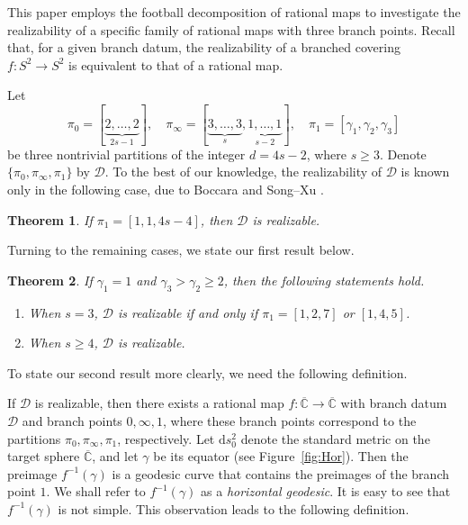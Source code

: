 \documentclass[microtype]{gtpart}     %
\newtheorem{thm}{Theorem}[section]    %
\theoremstyle{definition}
\begin{document}
This paper employs the football decomposition of rational maps to investigate the realizability of a specific family of rational maps with three branch points. Recall that, for a given branch datum, the realizability of a branched covering $f \colon S^{2} \to S^{2}$ is equivalent to that of a rational map.

Let
\[
\pi_{0}=[\underbrace{2,\ldots,2}_{2s-1}],\quad
\pi_{\infty}=[\underbrace{3,\ldots,3}_{s},\underbrace{1,\ldots,1}_{s-2}],\quad
\pi_{1}=[\gamma_1,\gamma_2,\gamma_3]
\]
be three nontrivial partitions of the integer \(d=4s-2\), where \(s\geq3\). Denote $\{\pi_{0},\pi_{\infty},\pi_{1}\}$ by $\mathcal D$.
To the best of our knowledge, the realizability of $\mathcal D$ is known only in the following case, due to Boccara \cite{Bo82} and Song--Xu \cite{SX20}.

\begin{thm}\cite{Bo82,SX20}
If $\pi_{1}=[1,1,4s-4]$, then $\mathcal D$ is realizable.
\end{thm}

Turning to the remaining cases, we state our first result below.

\begin{thm}\label{MThm1}
If $\gamma_{1}=1$ and $\gamma_{3}>\gamma_{2}\geq2$, then the following statements hold.
\begin{enumerate}
\item When $s=3$, $\mathcal D$ is realizable if and only if $\pi_{1}=[1,2,7]$ or $[1,4,5]$.
\item When $s\geq4$, $\mathcal D$ is realizable.
\end{enumerate}
\end{thm}

To state our second result more clearly, we need the following definition.

If $\mathcal D$ is realizable, then there exists a rational map $f: \overline{\mathbb{C}}\to \overline{\mathbb{C}}$ with branch datum $\mathcal D$ and branch points $0,\infty,1$, where these branch points correspond to the partitions $\pi_0,\pi_\infty,\pi_1$, respectively. Let $\mathrm{d}s_0^2$ denote the standard metric on the target sphere $\overline{\mathbb{C}}$, and let $\gamma$ be its equator (see Figure~\ref{fig:Hor}). Then the preimage $f^{-1}(\gamma)$ is a geodesic curve that contains the preimages of the branch point $1$. We shall refer to $f^{-1}(\gamma)$ as a \emph{horizontal geodesic}. It is easy to see that $f^{-1}(\gamma)$ is not simple. This observation leads to the following definition.
\end{document}
